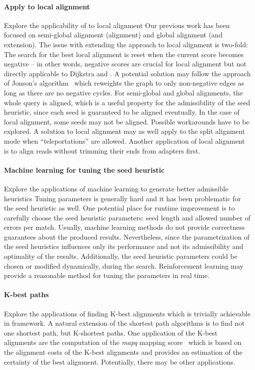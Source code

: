 \paragraph{Apply \A to local alignment}
Explore the applicability of \A to local alignment Our previous work has been
focused on semi-global alignment (alignment) and global alignment (and
extension). The issue with extending the \A approach to local alignment is
two-fold: The search for the best local alignment is reset when the current
score becomes negative – in other words, negative scores are crucial for local
alignment but not directly applicable to Dijkstra and \A. A potential solution
may follow the approach of Jonson's algorithm~\citep{johnson1977efficient} which
reweights the graph to only non-negative edges as long as there are no negative
cycles. For semi-global and global alignments, the whole query is aligned, which
is a useful property for the admissibility of the seed heuristic, since each
seed is guaranteed to be aligned eventually. In the case of local alignment,
some seeds may not be aligned. Possible workarounds have to be explored. A
solution to local alignment may as well apply to the split alignment mode when
``teleportations'' are allowed. Another application of local alignment is to
align reads without trimming their ends from adapters first.

\paragraph{Machine learning for tuning the seed heuristic}
Explore the applications of machine learning to generate better admissible
heuristics Tuning parameters is generally hard and it has been problematic for
the seed heuristic as well. One potential place for runtime improvement is to
carefully choose the seed heuristic parameters: seed length and allowed number
of errors per match. Usually, machine learning methods do not provide correctness
guarantees about the produced results. Nevertheless, since the parametrization
of the seed heuristics influences only its performance and not its admissibility
and optimality of the results. Additionally, the seed heuristic parameters could
be chosen or modified dynamically, during the \A search. Reinforcement learning
may provide a reasonable method for tuning the parameters in real time.

\paragraph{K-best paths}
Explore the applications of finding K-best alignments which is trivially
achievable in \A framework. A natural extension of the shortest path algorithms
is to find not one shortest path, but K-shortest paths. One application of the
K-best alignments are the computation of the \textit{mapq} mapping
score~\citep{li2008mapping} which is based on the alignment costs of the K-best
alignments and provides an estimation of the certainty of the best alignment.
Potentially, there may be other applications.


